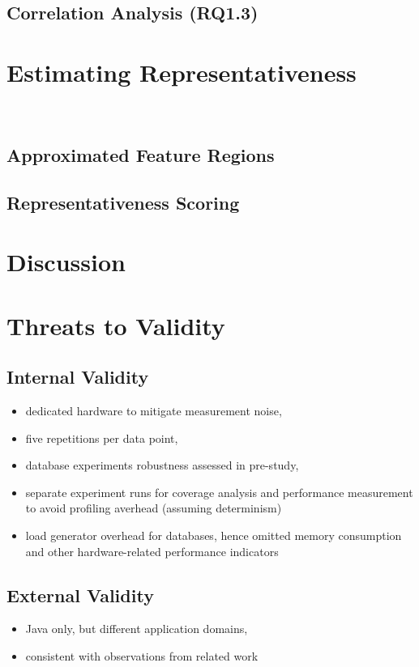 \subsection{Correlation Analysis (RQ1.3)}


\section{Estimating Representativeness}~\label{sec:metric}

\subsection{Approximated Feature Regions}

\subsection{Representativeness Scoring}

\section{Discussion}

\section{Threats to Validity}\label{sec:threats}
\subsection{Internal Validity}\label{sec:internal_validity}
\begin{itemize}
	\item dedicated hardware to mitigate measurement noise, 
	\item five repetitions per data point, 
	\item database experiments robustness assessed in pre-study,
	\item separate experiment runs for coverage analysis and performance measurement to avoid profiling averhead (assuming determinism)
	\item load generator overhead for databases, hence omitted memory consumption and other hardware-related performance indicators 
\end{itemize}

\subsection{External Validity}\label{sec:external_validity}
\begin{itemize}
	\item Java only, but different application domains,
	\item consistent with observations from related work
\end{itemize}

